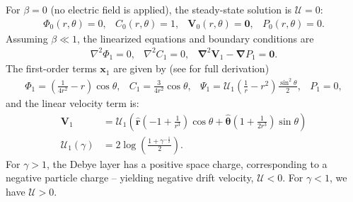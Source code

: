 \documentclass[MSc,beforeExam]{iitcsthesis}
\newcommand{\pars}[1]{\left(#1\right)}
\newcommand\Laplacian{\nabla^2}
\newcommand\bnabla{\boldsymbol{\nabla}}
\newcommand\bLaplacian{\boldsymbol{\nabla}^2}
\newcommand\bV{\boldsymbol{V}}
\newcommand\bx{\boldsymbol{x}}
\newcommand\br{\boldsymbol{r}}
\newcommand\brhat{\hat{\br}}
\newcommand\btheta{\boldsymbol{\theta}}
\newcommand\bthetahat{\hat{\btheta}}
\newcommand\bzero{\boldsymbol{0}}
\newcommand\cU{\mathscr{U}}
\begin{document}
For $\beta = 0$ (no electric field is applied), the steady-state solution is $\cU = 0$:
\begin{equation}\begin{array}{cccc}
\varPhi_0(r,\theta) = 0, &
C_0(r,\theta) = 1, &
\bV_0(r,\theta) = \bzero, &
P_0(r,\theta) = 0.
\end{array}\end{equation}
Assuming $\beta \ll 1$, the linearized equations and boundary conditions are
\begin{equation} \begin{array}{ccc}
\Laplacian \varPhi_1 = 0, &
\Laplacian C_1 = 0, &
\bLaplacian \bV_1 - \bnabla P_1 = \bzero.
\end{array}\end{equation}
The first-order terms $\bx_1$ are given by (see \cite{yariv2010migration} for full derivation)
\begin{equation} \begin{array}{cccc}
\varPhi_1 = \pars{\frac{1}{4r^2} - r}\cos\theta, &
C_1 = \frac{3}{4r^2} \cos\theta, &
\Psi_1 = \cU_1 \pars{\frac{1}{r} - r^2} \frac{\sin^2\theta}{2}, &
P_1 = 0,
\end{array} \end{equation}
and the linear velocity term is:
\begin{align} \label{eq:linear_velocity}
\bV_1 &= \cU_1 \pars{ \brhat \pars{-1 + \frac{1}{r^3}}\cos\theta 
+ \bthetahat \pars{1 + \frac{1}{2r^3}} \sin\theta } \\
\cU_1(\gamma) &= 2 \log \pars{\frac{1 + \gamma^{-\frac{1}{2}}}{2}}.
\end{align}
For $\gamma > 1$, the Debye layer has a positive space charge, 
corresponding to a negative particle charge -- 
yielding negative drift velocity, $\cU < 0$. 
For $\gamma < 1$, we have $\cU > 0$.

\end{document}
